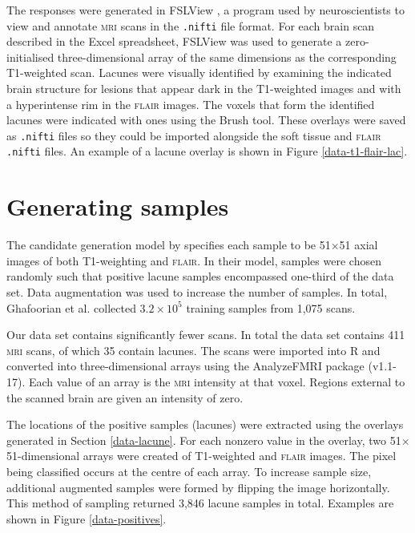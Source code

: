 The responses were generated in FSLView \citeyearpar{fslview}, a program used by neuroscientists to view and annotate \textsc{mri} scans in the \texttt{.nifti} file format. For each brain scan described in the Excel spreadsheet, FSLView \citeyearpar{fslview} was used to generate a zero-initialised three-dimensional array of the same dimensions as the corresponding T1-weighted scan. Lacunes were visually identified by examining the indicated brain structure for lesions that appear dark in the T1-weighted images and with a hyperintense rim in the \textsc{flair} images. The voxels that form the identified lacunes were indicated with ones using the Brush tool. These overlays were saved as \texttt{.nifti} files so they could be imported alongside the soft tissue and \textsc{flair} \texttt{.nifti} files. An example of a lacune overlay is shown in Figure \ref{data-t1-flair-lac}.




\section{Generating samples}\label{data-samples}

The candidate generation model by \cite{GhafoorianM.2017Dml3} specifies each sample to be 51$\times$51 axial images of both T1-weighting and \textsc{flair}. In their model, samples were chosen randomly such that positive lacune samples encompassed one-third of the data set. Data augmentation was used to increase the number of samples. In total, Ghafoorian et al. collected $3.2\times10^5$ training samples from 1,075 scans.

Our data set contains significantly fewer scans. In total the data set contains 411 \textsc{mri} scans, of which 35 contain lacunes. The scans were imported into R and converted into three-dimensional arrays using the AnalyzeFMRI package (v1.1-17). Each value of an array is the \textsc{mri} intensity at that voxel. Regions external to the scanned brain are given an intensity of zero.

The locations of the positive samples (lacunes) were extracted using the overlays generated in Section \ref{data-lacune}. For each nonzero value in the overlay, two 51$\times$51-dimensional arrays were created of T1-weighted and \textsc{flair} images. The pixel being classified occurs at the centre of each array. To increase sample size, additional augmented samples were formed by flipping the image horizontally. This method of sampling returned 3,846 lacune samples in total. Examples are shown in Figure \ref{data-positives}.

